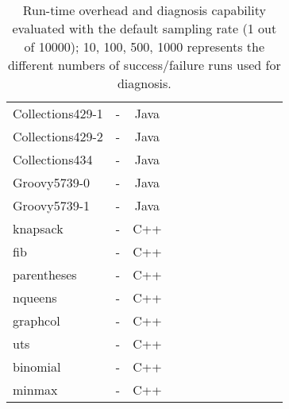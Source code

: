 \begin{table*}[h!]
\begin{tabular}{lccccccccccc}
    Collections429-1    &  -  & Java  &  &              &    &                                 &                   &                           &                  &&              \\
    Collections429-2    &  -  & Java  &  &              &    &                                 &                   &                           &                  &&              \\
    Collections434    & -   & Java  &  &              &    &                                 &                   &                           &                    &&            \\
    \midrule
    Groovy5739-0      & -  & Java  &  &              &    &                                 &                   &                           &                     &&           \\
    Groovy5739-1      & -  & Java  &  &              &    &                                 &                   &                           &                     &&          \\
    \midrule
    \midrule
    knapsack      &  -  & C++  &  &              &    &                                 &                   &                           &                         &&     \\
    fib      &  - & C++  &  &              &    &                                 &                   &                           &                               && \\
    parentheses      & -   & C++  &  &              &    &                                 &                   &                           &                      &&          \\
    nqueens      &  -  & C++  &  &              &    &                                 &                   &                           &                          &&      \\
    graphcol      &  -  & C++  &  &              &    &                                 &                   &                           &                         &&     \\
    uts      &  -  & C++  &  &              &    &                                 &                   &                           &                              && \\
    binomial      &  -  & C++  &  &              &    &                                 &                   &                           &                         &&       \\
    minmax      &  -  & C++  &  &              &    &                                 &                   &                           &                           &&    \\


    \bottomrule
   \end{tabular}
  \caption{Run-time overhead and diagnosis capability evaluated with the default sampling rate (1 out of 10000); 10, 100, 500, 1000 represents the different numbers of success/failure runs used for diagnosis.}
  \label{tab:LBR}
\end{table*}
